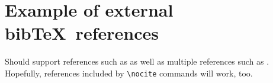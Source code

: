 \documentclass[a4paper]{article}
\begin{document}
\section*{Example of external bib\TeX\ references}

Should support references such as \citet{Evert:04b} as well as multiple
references such as
\citep{Luedeling:Evert:Heid:00,Evert:Luedeling:01,Luedeling:Evert:03}.
Hopefully, references included by \verb_\nocite_ commands will work, too.
\nocite{Krenn:00}





\end{document}

